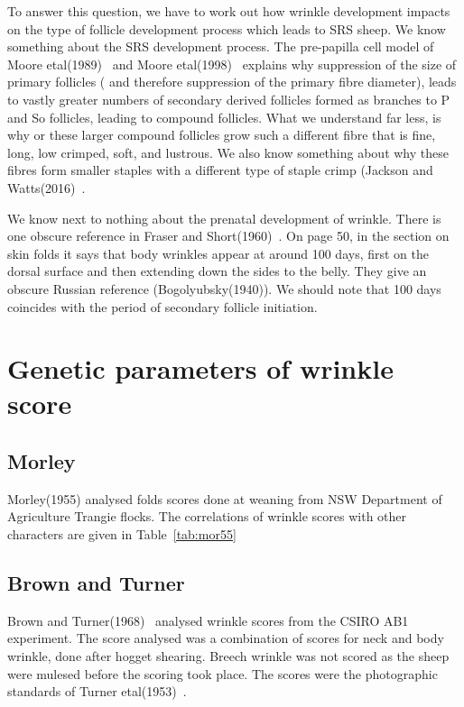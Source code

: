 \documentclass[titlepage]{article}  %
\begin{document}
To answer this question, we have to work out how wrinkle development impacts on the type of follicle development process which leads to SRS sheep. We know something about the SRS development process. The pre-papilla cell model of Moore etal(1989)~\cite{moor:89} and Moore etal(1998)~\cite{moor:98} explains why suppression of the size of primary follicles ( and therefore suppression of the primary fibre diameter), leads to vastly greater numbers of secondary derived follicles formed as branches to P and So follicles, leading to compound follicles. What we understand far less, is why or these larger compound follicles grow such a different fibre that is fine, long, low crimped, soft, and lustrous.  We also know something about why these fibres form smaller staples with a different type of staple crimp (Jackson and Watts(2016)~\cite{jack:16}. 

We know next to nothing about the prenatal development of wrinkle. There is one obscure reference in Fraser and Short(1960)~\cite{fras:60}. On page 50, in the section on skin folds it says that body wrinkles appear at around 100 days, first on the dorsal surface and then extending down the sides to the belly. They give an obscure Russian reference (Bogolyubsky(1940)). We should note that 100 days coincides with the period of secondary follicle initiation.


\section{Genetic parameters of wrinkle score}
\subsection{Morley}
Morley(1955) analysed folds scores done at weaning from NSW Department of Agriculture Trangie flocks. The correlations of wrinkle scores with other characters are given in Table~\ref{tab:mor55}


\subsection{Brown and Turner}
Brown and Turner(1968)~\cite{brow:68} analysed wrinkle scores from the CSIRO AB1 experiment. The score analysed was a combination of scores for neck and body wrinkle, done after hogget shearing.  Breech wrinkle was not scored as the sheep were mulesed before the scoring took place. The scores were the photographic standards of Turner etal(1953)~\cite{turn:53}.
\end{document}
